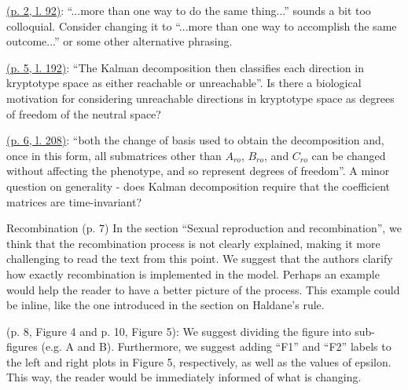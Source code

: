 \reply{
}

\begin{point}{}
  \hyperlink{rev2:2}{(p. 2, l. 92)}: ``...more than one way to do the same thing...'' sounds a bit too colloquial. Consider changing it to ``...more than one way to accomplish the same outcome...'' or some other alternative phrasing.
\end{point}


\begin{point}{}
  \hyperlink{rev2:3}{(p. 5, l. 192)}: ``The Kalman decomposition then classifies each direction in kryptotype space as either reachable or unreachable''. Is there a biological motivation for considering unreachable directions in kryptotype space as degrees of freedom of the neutral space?
\end{point}


\begin{point}{}
\hyperlink{rev2:4}{(p. 6, l. 208)}: ``both the change of basis used to obtain the decomposition and, once in this form, all submatrices other than $A_{ro}$, $B_{ro}$, and $C_{ro}$ can be changed without affecting the phenotype, and so represent degrees of freedom''. A minor question on generality - does Kalman decomposition require that the coefficient matrices are time-invariant?
\end{point}


\begin{point}{Recombination}
(p. 7) In the section ``Sexual reproduction and recombination'', we think that the recombination process is not clearly explained, making it more challenging to read the text from this point. We suggest that the authors clarify how exactly recombination is implemented in the model. Perhaps an example would help the reader to have a better picture of the process. This example could be inline, like the one introduced in the section on Haldane's rule.
\end{point}

\reply{
}

\begin{point}{}
(p. 8, Figure 4 and p. 10, Figure 5): We suggest dividing the figure into sub-figures (e.g. A and B). Furthermore, we suggest adding ``F1'' and ``F2'' labels to the left and right plots in Figure 5, respectively, as well as the values of epsilon. This way, the reader would be immediately informed of what is changing.
\end{point}

\reply{
}

